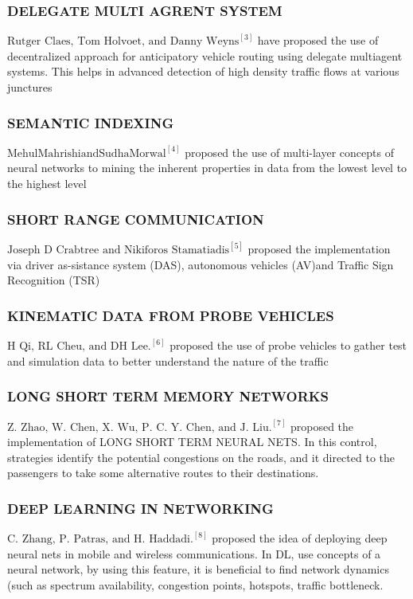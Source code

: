 \documentclass[12pt]{article}
\begin{document}
\subsubsection{\textbf{DELEGATE MULTI AGRENT SYSTEM}}
$\text{Rutger Claes, Tom Holvoet, and Danny Weyns}^{[3]}$ have proposed the use of decentralized approach for anticipatory vehicle routing using delegate multiagent systems. This helps in advanced detection of high density traffic flows at various junctures 

\subsubsection{\textbf{SEMANTIC INDEXING}}
$\text{MehulMahrishiandSudhaMorwal}^{[4]}$ proposed the use of multi-layer concepts of neural networks to mining the inherent properties in data from the lowest level to the highest level 

\subsubsection{\textbf{SHORT RANGE COMMUNICATION}}
$\text{Joseph D Crabtree and Nikiforos Stamatiadis}^{[5]}$ proposed the implementation via driver as-sistance system (DAS), autonomous vehicles (AV)and Traffic Sign Recognition (TSR)

\subsubsection{\textbf{KINEMATIC DATA FROM PROBE VEHICLES}}
$\text{H Qi, RL Cheu, and DH Lee.}^{[6]}$ proposed the use of probe vehicles to gather test and simulation data to better understand the nature of the traffic 

\subsubsection{\textbf{LONG SHORT TERM MEMORY NETWORKS}}
$\text{Z. Zhao, W. Chen, X. Wu, P. C. Y. Chen, and J. Liu.}^{[7]}$ proposed the implementation of LONG SHORT TERM NEURAL NETS. In this control, strategies identify the potential congestions on the roads, and it directed to the passengers to take some alternative routes to their destinations. 

\subsubsection{\textbf{DEEP LEARNING IN NETWORKING}}
$\text{C. Zhang, P. Patras, and H. Haddadi.}^{[8]}$ proposed the idea of deploying deep neural nets in mobile and wireless communications. In DL, use concepts of a neural network, by using this feature, it is beneficial to find network dynamics (such as spectrum availability, congestion points, hotspots, traffic bottleneck. 
\end{document}
